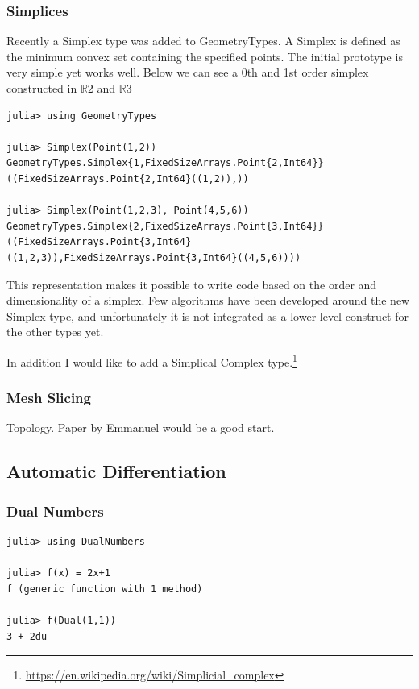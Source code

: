 \subsubsection{Simplices}

Recently a Simplex type was added to GeometryTypes. A Simplex is defined
as the minimum convex set containing the specified points. The initial
prototype is very simple yet works well. Below we can see a 0th and 1st order
simplex constructed in $\mathbb{R}2$ and $\mathbb{R}3$
\begin{lstlisting}
julia> using GeometryTypes

julia> Simplex(Point(1,2))
GeometryTypes.Simplex{1,FixedSizeArrays.Point{2,Int64}}((FixedSizeArrays.Point{2,Int64}((1,2)),))

julia> Simplex(Point(1,2,3), Point(4,5,6))
GeometryTypes.Simplex{2,FixedSizeArrays.Point{3,Int64}}((FixedSizeArrays.Point{3,Int64}((1,2,3)),FixedSizeArrays.Point{3,Int64}((4,5,6))))
\end{lstlisting}

This representation makes it possible to write code based on the order and
dimensionality of a simplex. Few algorithms have been developed around the
new Simplex type, and unfortunately it is not integrated as a lower-level
construct for the other types yet.

In addition I would like to add a Simplical Complex type.\footnote{\url{https://en.wikipedia.org/wiki/Simplicial_complex}}

\subsubsection{Mesh Slicing}

Topology. Paper by Emmanuel would be a good start.

\subsection{Automatic Differentiation}

\subsubsection{Dual Numbers}
\begin{lstlisting}
julia> using DualNumbers

julia> f(x) = 2x+1
f (generic function with 1 method)

julia> f(Dual(1,1))
3 + 2du
\end{lstlisting}


